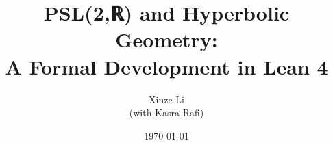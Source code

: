 \documentclass[11pt]{report}
\begin{document}
\title{PSL(2,ℝ) and Hyperbolic Geometry:\\
A Formal Development in Lean 4}
\author{Xinze Li\\
(with Kasra Rafi)}
\date{\today}

\maketitle

\tableofcontents


\end{document}
